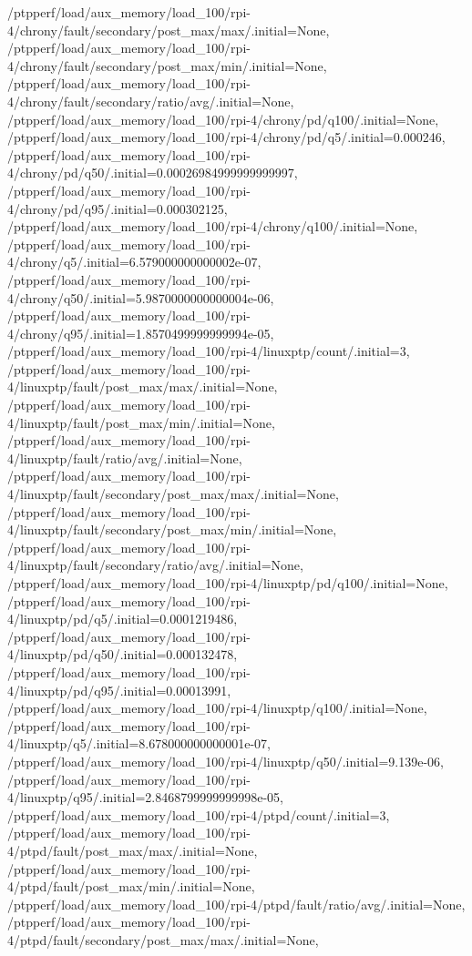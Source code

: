 {    /ptpperf/load/aux_memory/load_100/rpi-4/chrony/fault/secondary/post_max/max/.initial=None,
    /ptpperf/load/aux_memory/load_100/rpi-4/chrony/fault/secondary/post_max/min/.initial=None,
    /ptpperf/load/aux_memory/load_100/rpi-4/chrony/fault/secondary/ratio/avg/.initial=None,
    /ptpperf/load/aux_memory/load_100/rpi-4/chrony/pd/q100/.initial=None,
    /ptpperf/load/aux_memory/load_100/rpi-4/chrony/pd/q5/.initial=0.000246,
    /ptpperf/load/aux_memory/load_100/rpi-4/chrony/pd/q50/.initial=0.00026984999999999997,
    /ptpperf/load/aux_memory/load_100/rpi-4/chrony/pd/q95/.initial=0.000302125,
    /ptpperf/load/aux_memory/load_100/rpi-4/chrony/q100/.initial=None,
    /ptpperf/load/aux_memory/load_100/rpi-4/chrony/q5/.initial=6.579000000000002e-07,
    /ptpperf/load/aux_memory/load_100/rpi-4/chrony/q50/.initial=5.9870000000000004e-06,
    /ptpperf/load/aux_memory/load_100/rpi-4/chrony/q95/.initial=1.8570499999999994e-05,
    /ptpperf/load/aux_memory/load_100/rpi-4/linuxptp/count/.initial=3,
    /ptpperf/load/aux_memory/load_100/rpi-4/linuxptp/fault/post_max/max/.initial=None,
    /ptpperf/load/aux_memory/load_100/rpi-4/linuxptp/fault/post_max/min/.initial=None,
    /ptpperf/load/aux_memory/load_100/rpi-4/linuxptp/fault/ratio/avg/.initial=None,
    /ptpperf/load/aux_memory/load_100/rpi-4/linuxptp/fault/secondary/post_max/max/.initial=None,
    /ptpperf/load/aux_memory/load_100/rpi-4/linuxptp/fault/secondary/post_max/min/.initial=None,
    /ptpperf/load/aux_memory/load_100/rpi-4/linuxptp/fault/secondary/ratio/avg/.initial=None,
    /ptpperf/load/aux_memory/load_100/rpi-4/linuxptp/pd/q100/.initial=None,
    /ptpperf/load/aux_memory/load_100/rpi-4/linuxptp/pd/q5/.initial=0.0001219486,
    /ptpperf/load/aux_memory/load_100/rpi-4/linuxptp/pd/q50/.initial=0.000132478,
    /ptpperf/load/aux_memory/load_100/rpi-4/linuxptp/pd/q95/.initial=0.00013991,
    /ptpperf/load/aux_memory/load_100/rpi-4/linuxptp/q100/.initial=None,
    /ptpperf/load/aux_memory/load_100/rpi-4/linuxptp/q5/.initial=8.678000000000001e-07,
    /ptpperf/load/aux_memory/load_100/rpi-4/linuxptp/q50/.initial=9.139e-06,
    /ptpperf/load/aux_memory/load_100/rpi-4/linuxptp/q95/.initial=2.8468799999999998e-05,
    /ptpperf/load/aux_memory/load_100/rpi-4/ptpd/count/.initial=3,
    /ptpperf/load/aux_memory/load_100/rpi-4/ptpd/fault/post_max/max/.initial=None,
    /ptpperf/load/aux_memory/load_100/rpi-4/ptpd/fault/post_max/min/.initial=None,
    /ptpperf/load/aux_memory/load_100/rpi-4/ptpd/fault/ratio/avg/.initial=None,
    /ptpperf/load/aux_memory/load_100/rpi-4/ptpd/fault/secondary/post_max/max/.initial=None,
}
